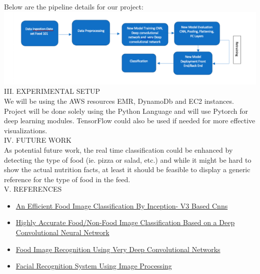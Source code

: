 \documentclass{IEEEtran}
\begin{document}
Below are the pipeline details for our project:\\

\includegraphics[scale=0.4]{pipeline}\\

III. EXPERIMENTAL SETUP\\

We will be using the AWS resources EMR, DynamoDb and EC2 instances. Project will be done solely using the Python Language and will use Pytorch for deep learning modules. TensorFlow could also be used if needed for more effective visualizations.\\


IV. FUTURE WORK\\

As potential future work, the real time classification could be enhanced by detecting the type of food (ie. pizza or salad, etc.) and while it might be hard to show the actual nutrition facts, at least it should be feasible to display a generic reference for the type of food in the feed.\\


V. REFERENCES\\
\begin{itemize}

\item \href{https://www.semanticscholar.org/paper/An-Efficient-Food-Image-Classification-By-Inception-Burkapalli-Patil/93901843674a8729d2ec6d4b2ac8b1a27b3e0ec6}{An Efficient Food Image Classification By Inception- V3 Based Cnns}

\item \href{https://www.semanticscholar.org/paper/Highly-Accurate-Food%2FNon-Food-Image-Classification-Kagaya-Aizawa/ac72cd1644da89315c44bd2bf320bec7397227a3}{Highly Accurate Food/Non-Food Image Classification Based on a Deep Convolutional Neural Network}

\item \href{https://www.semanticscholar.org/paper/Food-Image-Recognition-Using-Very-Deep-Networks-Hassannejad-Matrella/b69170c11e1808511cc61aa6413ac5f8a6e4d501}{Food Image Recognition Using Very Deep Convolutional Networks}

\item \href{https://www.semanticscholar.org/paper/FACIAL-RECOGNITION-SYSTEM-USING-IMAGE-PROCESSING-ashish-Bimbisara/73dac5236f6a77f45798fa50e2da2effc63a0053}{Facial Recognition System Using Image Processing}

\end{itemize}
\end{document}
